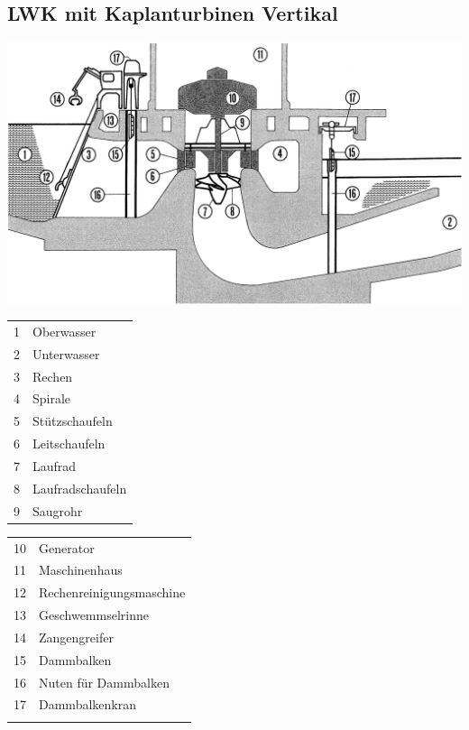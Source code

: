 \subsection{LWK mit Kaplanturbinen Vertikal}

\begin{center}
    \includegraphics[width=0.95\columnwidth, align=c]{images/Laufwasserkraftwerke_Kaplanturbine_Vertikal.png}
\end{center}

\begin{minipage}[t]{0.38\columnwidth}
    \begin{tabular}{c l}
        1 & Oberwasser \\
        2 & Unterwasser \\
        3 & Rechen \\
        4 & Spirale \\
        5 & Stützschaufeln \\
        6 & Leitschaufeln \\
        7 & Laufrad \\
        8 & Laufradschaufeln \\
        9 & Saugrohr \\
    \end{tabular}
\end{minipage}
\hfill
\begin{minipage}[t]{0.58\columnwidth}
    \begin{tabular}{c l}
        10 & Generator \\
        11 & Maschinenhaus \\
        12 & Rechenreinigungsmaschine \\
        13 & Geschwemmselrinne \\
        14 & Zangengreifer \\
        15 & Dammbalken \\
        16 & Nuten für Dammbalken \\
        17 & Dammbalkenkran \\
           &  \\
    \end{tabular}
\end{minipage}



